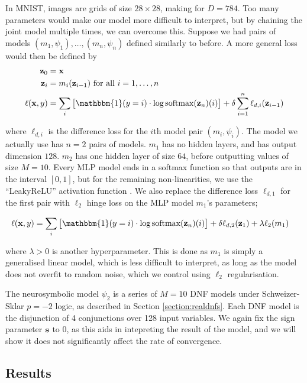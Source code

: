 In MNIST, images are grids of size $28 \times 28$, making for $D=784$. Too many parameters would make our model more difficult to interpret, but by chaining the joint model multiple times, we can overcome this. Suppose we had pairs of models $(m_1, \psi_1), \dots, (m_n, \psi_n)$ defined similarly to before. A more general loss would then be defined by
$$
\begin{aligned}
\vz_0 &= \vx \\
\vz_i &= m_i(\vz_{i-1}) \text{ for all } i = 1, \dots, n \\
\ell(\vx, y) &= \sum_i \left[ \mathbbm{1}(y = i) \cdot \log \text{softmax}(\vz_n)(i) \right] + \delta \sum_{i=1}^n \ell_{d,i}(\vz_{i-1})
\end{aligned}
$$

where $\ell_{d,i}$ is the difference loss for the $i$th model pair $(m_i, \psi_i)$. The model we actually use has $n=2$ pairs of models. $m_1$ has no hidden layers, and has output dimension $128$. $m_2$ has one hidden layer of size $64$, before outputting values of size $M=10$. Every MLP model ends in a softmax function so that outputs are in the interval $[0,1]$, but for the remaining non-linearities, we use the ``LeakyReLU'' activation function \cite{leakyrelu}. We also replace the difference loss $\ell_{d,1}$ for the first pair with $\ell_2$ hinge loss on the MLP model $m_1$'s parameters;

$$
\begin{aligned}
\ell(\vx, y) &= \sum_i \left[ \mathbbm{1}(y = i) \cdot \log \text{softmax}(\vz_n)(i) \right] + \delta \ell_{d,2}(\vz_1) + \lambda \ell_2(m_1)
\end{aligned}
$$

where $\lambda > 0$ is another hyperparameter. This is done as $m_1$ is simply a generalised linear model, which is less difficult to interpret, as long as the model does not overfit to random noise, which we control using $\ell_2$ regularisation.

The neurosymbolic model $\psi_2$ is a series of $M=10$ DNF models under Schweizer-Sklar $p=-2$ logic, as described in Section \ref{section:realdnfs}. Each DNF model is the disjunction of 4 conjunctions over 128 input variables. We again fix the sign parameter $\mathbf{s}$ to 0, as this aids in intepreting the result of the model, and we will show it does not significantly affect the rate of convergence.

\subsection{Results}

